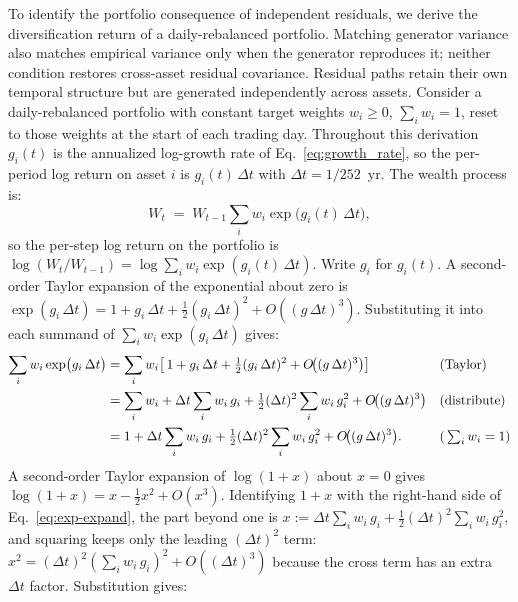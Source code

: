 To identify the portfolio consequence of independent residuals, we derive the diversification return of a daily-rebalanced portfolio. Matching generator variance also matches empirical variance only when the generator reproduces it; neither condition restores cross-asset residual covariance.
Residual paths retain their own temporal structure but are generated independently across assets. Consider a daily-rebalanced portfolio
with constant target weights $w_i \ge 0$, $\sum_i w_i = 1$,
reset to those weights at the start of each trading day. Throughout
this derivation $g_i(t)$ is the annualized log-growth rate of
Eq.~\eqref{eq:growth_rate}, so the per-period log return on asset
$i$ is $g_i(t)\,\Delta t$ with $\Delta t = 1/252$~yr. The wealth
process is:
\begin{equation}
  W_t \;=\; W_{t-1} \sum_{i} w_i \exp\!\big(g_i(t)\,\Delta t\big),
  \label{eq:wealth-recursion}
\end{equation}
so the per-step log return on the portfolio is
$\log(W_t/W_{t-1}) = \log\!\sum_i w_i \exp(g_i(t)\,\Delta t)$. Write $g_i$ for $g_i(t)$. A
second-order Taylor expansion of the exponential about zero is
$\exp(g_i\,\Delta t) = 1 + g_i\,\Delta t + \tfrac{1}{2}(g_i\,\Delta t)^2
+ O((g\,\Delta t)^3)$. Substituting it into each summand of
$\sum_i w_i \exp(g_i\,\Delta t)$ gives:
\begin{align}
  \sum_{i} w_i \exp\!\big(g_i\,\Delta t\big)
   &= \sum_{i} w_i \!\left[\,1 + g_i\,\Delta t
        + \tfrac{1}{2}(g_i\,\Delta t)^2
        + O\!\big((g\,\Delta t)^3\big)\right]
       && \text{(Taylor)} \notag \\
   &= \sum_{i} w_i
        + \Delta t \sum_{i} w_i\, g_i
        + \tfrac{1}{2}(\Delta t)^2 \sum_{i} w_i\, g_i^2
        + O\!\big((g\,\Delta t)^3\big)
       && \text{(distribute)} \notag \\
   &= 1 + \Delta t \sum_{i} w_i\, g_i
        + \tfrac{1}{2}(\Delta t)^2 \sum_{i} w_i\, g_i^2
        + O\!\big((g\,\Delta t)^3\big).
       && \text{(}\textstyle\sum_i w_i = 1\text{)}
  \label{eq:exp-expand}
\end{align}
A second-order Taylor expansion of $\log(1+x)$ about $x=0$ gives
$\log(1+x) = x - \tfrac{1}{2}x^2 + O(x^3)$. Identifying $1 + x$ with
the right-hand side of Eq.~\eqref{eq:exp-expand}, the part beyond one
is
$x :=\Delta t \sum_i w_i\, g_i + \tfrac{1}{2}(\Delta t)^2 \sum_i w_i\, g_i^2$,
and squaring keeps only the leading $(\Delta t)^2$ term:
$x^2 = (\Delta t)^2 (\sum_i w_i\, g_i)^2 + O((\Delta t)^3)$ because
the cross term has an extra $\Delta t$ factor. Substitution gives:
